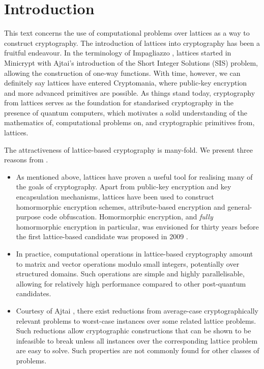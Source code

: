 \section{Introduction}
This text concerns the use of computational problems over lattices as a way to construct cryptography. The introduction of lattices into cryptography has been a fruitful endeavour. In the terminology of Impagliazzo \cite{imp95}, lattices started in Minicrypt with Ajtai's introduction of the Short Integer Solutions (SIS) problem, allowing the construction of one-way functions. With time, however, we can definitely say lattices have entered Cryptomania, where public-key encryption and more advanced primitives are possible. As things stand today, cryptography from lattices serves as the foundation for standarised cryptography in the presence of quantum computers, which motivates a solid understanding of the mathematics of, computational problems on, and cryptographic primitives from, lattices. 

The attractiveness of lattice-based cryptography is many-fold. We present three reasons from \cite{peikert_dec}.
\begin{itemize}
    \item As mentioned above, lattices have proven a useful tool for realising many of the goals of cryptography. Apart from public-key encryption and key encapsulation mechanisms, lattices have been used to construct homormorphic encryption schemes, attribute-based encryption and general-purpose code obfuscation. Homormorphic encryption, and \textit{fully} homormorphic encryption in particular, was envisioned for thirty years before the first lattice-based candidate was proposed in 2009 \cite{Gen09}.
    \item In practice, computational operations in lattice-based cryptography amount to matrix and vector operations modulo small integers, potentially over structured domains. Such operations are simple and highly parallelisable, allowing for relatively high performance compared to other post-quantum candidates. 
    \item Courtesy of Ajtai \cite{ajt96}, there exist reductions from average-case cryptographically relevant problems to worst-case instances over some related lattice problems. Such reductions allow cryptographic constructions that can be shown to be infeasible to break unless all instances over the corresponding lattice problem are easy to solve. Such properties are not commonly found for other classes of problems.
\end{itemize}

